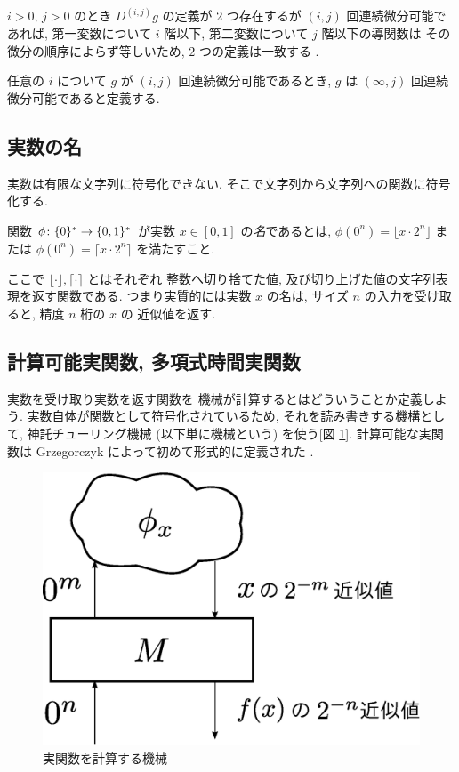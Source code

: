 $i > 0$, $j > 0$ のとき $D^{(i,j)} g$ の定義が $2$ つ存在するが
$(i, j)$ 回連続微分可能であれば,
第一変数について $i$ 階以下, 第二変数について $j$ 階以下の導関数は
その微分の順序によらず等しいため, $2$ つの定義は一致する \cite{takagi1968analysis}.

任意の $i$ について $g$ が $(i, j)$ 回連続微分可能であるとき,
$g$ は $(\infty, j)$ 回連続微分可能であると定義する.

\subsection{実数の名}
 実数は有限な文字列に符号化できない. 
 そこで文字列から文字列への関数に符号化する.
 \begin{definition}[実数の名]
  関数 $\phi \colon \{0\}^* \to \{0, 1\}^*$ が実数 $x \in [0,1]$ の\emph{名}であるとは,
  $\phi(0^n) = \lfloor x \cdot 2^n \rfloor$ または
  $\phi(0^n) = \lceil x \cdot 2^n \rceil$ を満たすこと.
 \end{definition}
ここで $\lfloor \cdot \rfloor, \lceil \cdot \rceil$ とはそれぞれ
整数へ切り捨てた値, 及び切り上げた値の文字列表現を返す関数である.
つまり実質的には実数 $x$ の名は, 
サイズ $n$ の入力を受け取ると, 精度 $n$ 桁の $x$ の
近似値を返す.



\subsection{計算可能実関数, 多項式時間実関数}

実数を受け取り実数を返す関数を
機械が計算するとはどういうことか定義しよう. 
実数自体が関数として符号化されているため, 
それを読み書きする機構として, 
神託チューリング機械 (以下単に機械という) を使う[図 \ref{fig:model-of-function}].
計算可能な実関数は Grzegorczyk によって初めて形式的に定義された
\cite{grzegorczyk1955computable}.

 \begin{figure}
  \begin{center}
   \includegraphics[height=0.15\textheight]{image/model-of-function.eps}
  \end{center}
  \caption{実関数を計算する機械}
  \label{fig:model-of-function}
 \end{figure}


